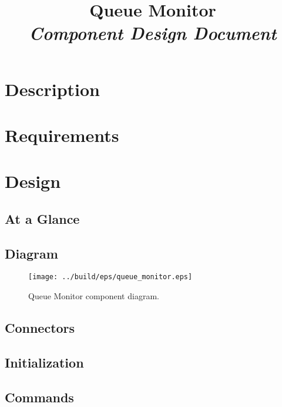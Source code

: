 



\title{\textbf{Queue Monitor} \\
\large\textit{Component Design Document}}
\date{}
\maketitle

\section{Description}


\section{Requirements}


\section{Design}

\subsection{At a Glance}


\subsection{Diagram}
\begin{figure}[H]
  \texttt{[image: ../build/eps/queue\_monitor.eps]}
  \caption{Queue Monitor component diagram.}
\end{figure}

\subsection{Connectors}


\subsection{Initialization}


\subsection{Commands}

